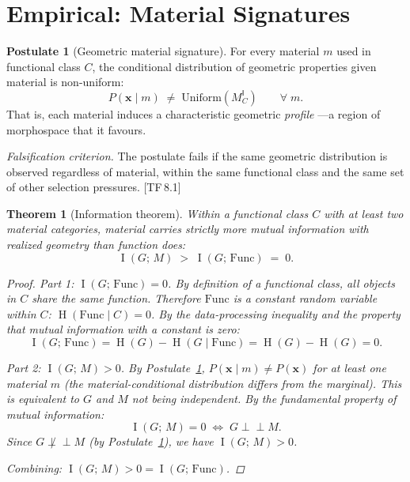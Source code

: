 \documentclass[11pt, a4paper]{article}
\theoremstyle{definition}
\newtheorem{postulate}[definition]{Postulate}
\theoremstyle{plain}
\newtheorem{theorem}[definition]{Theorem}
\theoremstyle{remark}
\newcommand{\MC}{M^{\mathsf{I}}_C}          %
\DeclareMathOperator{\MI}{I}                 %
\DeclareMathOperator{\Ent}{H}                %
\newcommand{\TF}[1]{\textnormal{[TF\,#1]}}  %
\begin{document}
\newpage
\section{Empirical: Material Signatures}\label{sec:empirical}

\begin{postulate}[Geometric material signature]\label{post:5.1}
For every material $m$ used in functional class $C$, the conditional
distribution of geometric properties given material is non-uniform:
\[
  P(\bm{x} \mid m) \;\neq\; \mathrm{Uniform}(\MC)
  \qquad \forall\; m.
\]
That is, each material induces a characteristic geometric \emph{profile}
---a region of morphospace that it favours.

\medskip\noindent
\textit{Falsification criterion.}
The postulate fails if the same geometric distribution is observed
regardless of material, within the same functional class and the same
set of other selection pressures. \TF{8.1}
\end{postulate}

\begin{theorem}[Information theorem]\label{thm:5.2}
Within a functional class $C$ with at least two material categories,
material carries strictly more mutual information with realized geometry
than function does:
\[
  \MI(G;\, M) \;>\; \MI(G;\, \mathrm{Func}) \;=\; 0.
\]

\begin{proof}
\textit{Part 1: $\MI(G;\, \mathrm{Func}) = 0$.}\;
By definition of a functional class, all objects in $C$ share the same
function. Therefore $\mathrm{Func}$ is a constant random variable within
$C$: $\Ent(\mathrm{Func} \mid C) = 0$. By the data-processing
inequality and the property that mutual information with a constant is
zero:
\[
  \MI(G;\, \mathrm{Func}) = \Ent(G) - \Ent(G \mid \mathrm{Func})
  = \Ent(G) - \Ent(G) = 0.
\]

\textit{Part 2: $\MI(G;\, M) > 0$.}\;
By Postulate~\ref{post:5.1}, $P(\bm{x} \mid m) \neq P(\bm{x})$ for
at least one material $m$ (the material-conditional distribution differs
from the marginal). This is equivalent to $G$ and $M$ not being
independent. By the fundamental property of mutual information:
\[
  \MI(G;\, M) = 0 \;\iff\; G \perp\!\!\!\perp M.
\]
Since $G \not\perp\!\!\!\perp M$ (by Postulate~\ref{post:5.1}), we
have $\MI(G;\, M) > 0$.

\textit{Combining:}\; $\MI(G;\, M) > 0 = \MI(G;\, \mathrm{Func})$.
\qedhere
\end{proof}
\end{theorem}
\end{document}
